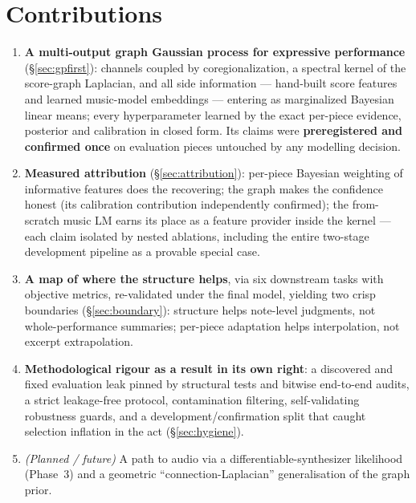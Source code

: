 \documentclass[11pt,a4paper]{report}
\newcommand{\placeholder}[1]{{\color{gray}\textit{#1}}}
\begin{document}
\section{Contributions}
\begin{enumerate}[leftmargin=*]
  \item \textbf{A multi-output graph Gaussian process for expressive performance}
        (\S\ref{sec:gpfirst}): channels coupled by coregionalization, a spectral
        kernel of the score-graph Laplacian, and all side information ---
        hand-built score features and learned music-model embeddings --- entering
        as marginalized Bayesian linear means; every hyperparameter learned by the
        exact per-piece evidence, posterior and calibration in closed form. Its
        claims were \textbf{preregistered and confirmed once} on evaluation pieces
        untouched by any modelling decision.
  \item \textbf{Measured attribution} (\S\ref{sec:attribution}): per-piece Bayesian
        weighting of informative features does the recovering; the graph makes the
        confidence honest (its calibration contribution independently confirmed);
        the from-scratch music LM earns its place as a feature provider inside the
        kernel --- each claim isolated by nested ablations, including the entire
        two-stage development pipeline as a provable special case.
  \item \textbf{A map of where the structure helps}, via six downstream tasks with
        objective metrics, re-validated under the final model, yielding two crisp
        boundaries (\S\ref{sec:boundary}): structure helps note-level judgments,
        not whole-performance summaries; per-piece adaptation helps interpolation,
        not excerpt extrapolation.
  \item \textbf{Methodological rigour as a result in its own right}: a discovered
        and fixed evaluation leak pinned by structural tests and bitwise
        end-to-end audits, a strict leakage-free protocol, contamination
        filtering, self-validating robustness guards, and a
        development/confirmation split that caught selection inflation in the act
        (\S\ref{sec:hygiene}).
  \item \placeholder{(Planned / future)} A path to audio via a
        differentiable-synthesizer likelihood (Phase~3) and a geometric
        ``connection-Laplacian'' generalisation of the graph prior.
\end{enumerate}
\end{document}

